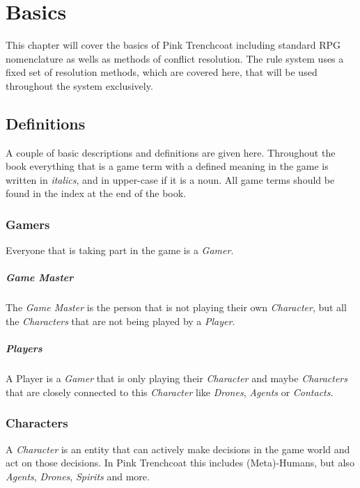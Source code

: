 \chapter{Basics}

This chapter will cover the basics of Pink Trenchcoat including standard RPG
nomenclature as wells as methods of conflict resolution. The rule system
uses a fixed set of resolution methods, which are covered here, that will be used
throughout the system exclusively.

\section{Definitions}

A couple of basic descriptions and definitions are given here.
Throughout the book everything that is a game term with a defined meaning in the
game is written in \textit{italics}, and in upper-case if it is a noun.
All game terms should be found in the index at the end of the book.

\subsection{Gamers}

Everyone that is taking part in the game is a \emph{Gamer}.

\paragraph{Game Master}

The \emph{Game Master} is the person that is not playing their own \emph{Character},
but all the \emph{Characters} that are not being played by a \emph{Player}.

\paragraph{Players}
A Player is a \emph{Gamer} that is only playing their \emph{Character} and maybe
\emph{Characters} that are closely connected to this \emph{Character} like
\emph{Drones}, \emph{Agents} or \emph{Contacts}.

\subsection{Characters}

A \emph{Character} is an entity that can actively make decisions in the game world
and act on those decisions. In Pink Trenchcoat this includes (Meta)-Humans, but also
\emph{Agents}, \emph{Drones}, \emph{Spirits} and more.

